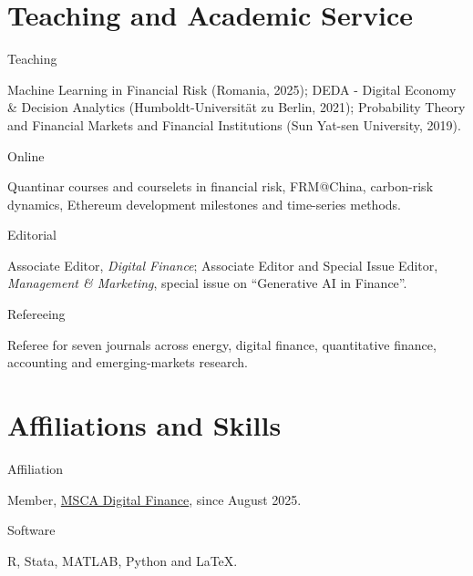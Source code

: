 \documentclass[11pt]{article}
\newcommand{\cvrow}[2]{%
  \par\noindent\needspace{2\baselineskip}%
  \begin{minipage}[t]{0.17\linewidth}\raggedright\sff\footnotesize\color{plum}#1\end{minipage}%
  \hfill\begin{minipage}[t]{0.81\linewidth}#2\end{minipage}%
  \par\addvspace{5.2pt}}
\begin{document}
\section{Teaching and Academic Service}
\cvrow{Teaching}{Machine Learning in Financial Risk (Romania, 2025); DEDA - Digital Economy
\& Decision Analytics (Humboldt-Universit\"at zu Berlin, 2021); Probability Theory and
Financial Markets and Financial Institutions (Sun Yat-sen University, 2019).}
\cvrow{Online}{Quantinar courses and courselets in financial risk, FRM@China, carbon-risk
dynamics, Ethereum development milestones and time-series methods.}
\cvrow{Editorial}{Associate Editor, \textit{Digital Finance}; Associate Editor and Special Issue
Editor, \textit{Management \& Marketing}, special issue on ``Generative AI in Finance''.}
\cvrow{Refereeing}{Referee for seven journals across energy, digital finance, quantitative finance,
accounting and emerging-markets research.}

\section{Affiliations and Skills}
\cvrow{Affiliation}{Member, \href{https://www.digital-finance-msca.com/people/ruting-wang}{MSCA Digital Finance}, since August 2025.}
\cvrow{Software}{R, Stata, MATLAB, Python and \LaTeX.}
\end{document}
